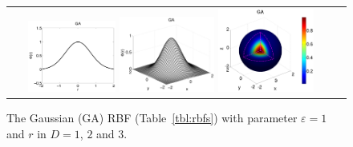 \begin{figure}[t]
\centering
\begin{tabular}{cc}
\includegraphics[width=0.275\textwidth]{matlab/ga_rbf.pdf}
\includegraphics[width=0.3\textwidth]{matlab/ga_rbf2D-eps-converted-to.pdf}
\includegraphics[width=0.3\textwidth]{matlab/ga_rbf3D-eps-converted-to.pdf}
\end{tabular} 
\caption{The Gaussian (GA) RBF (Table~\ref{tbl:rbfs}) with parameter $\varepsilon=1$ and $r$ in $D = 1$, $2$ and $3$.}
\label{fig:rbf_dimension_example}
\end{figure} 
